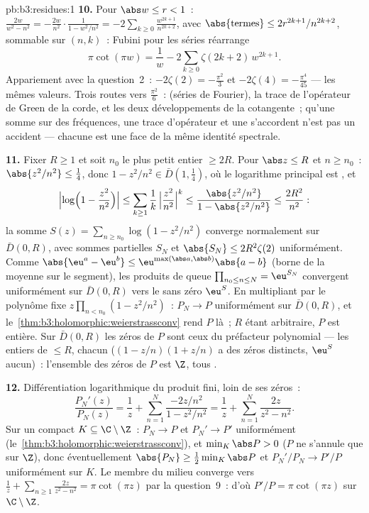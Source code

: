 \begin{solution}{pb:b3:residues:1}
\textbf{10.} Pour $\abs w \leq r < 1$~: $\frac{2w}{w^2 -
n^2} = -\frac{2w}{n^2}\cdot\frac1{1 - w^2/n^2} =
-2\sum_{k\geq0}\frac{w^{2k+1}}{n^{2k+2}}$, avec
$\abs{\text{termes}} \leq 2r^{2k+1}/n^{2k+2}$, sommable
sur $(n, k)$~: Fubini pour les séries réarrange
\[
\pi\cot(\pi w) = \frac1w -
2\sum_{k\geq0}\zeta(2k+2)\,w^{2k+1} .
\]
Appariement avec la question~2~: $-2\zeta(2) =
-\frac{\pi^2}3$ et $-2\zeta(4) = -\frac{\pi^4}{45}$ --- les
mêmes valeurs. Trois routes vers $\frac{\pi^2}6$~: 
(séries de Fourier), la trace de l'opérateur de Green de la
corde, et les deux développements de la cotangente~; qu'une
somme sur des fréquences, une trace d'opérateur et une
 s'accordent n'est pas un accident ---
chacune est une face de la même identité spectrale.

\textbf{11.} Fixer $R \geq 1$ et soit $n_0$ le plus petit
entier $\geq 2R$. Pour $\abs z \leq R$ et $n \geq n_0$~:
$\abs{z^2/n^2} \leq \frac14$, donc $1 - z^2/n^2 \in
\bar D(1, \frac14)$, où le logarithme principal est
, et
\[
\Bigl|\log\Bigl(1 - \frac{z^2}{n^2}\Bigr)\Bigr|
\leq \sum_{k\geq1}\frac1k\,\Bigl|\frac{z^2}{n^2}\Bigr|^k
\leq \frac{\abs{z^2/n^2}}{1 - \abs{z^2/n^2}}
\leq \frac{2R^2}{n^2} :
\]
la somme $S(z) = \sum_{n\geq n_0}\log(1 - z^2/n^2)$
converge normalement sur $\bar D(0, R)$, avec sommes
partielles  $S_N$ et $\abs{S_N} \leq
2R^2\zeta(2)$ uniformément. Comme $\abs{\eu^a - \eu^b}
\leq \eu^{\max(\abs a,\abs b)}\abs{a - b}$ (borne de la
moyenne sur le segment), les produits de queue
$\prod_{n_0\leq n\leq N} = \eu^{S_N}$ convergent
uniformément sur $\bar D(0, R)$ vers le sans zéro $\eu^S$.
En multipliant par le polynôme fixe $z\prod_{n<n_0}(1 -
z^2/n^2)$~: $P_N \to P$ uniformément sur $\bar D(0, R)$, et
le~\cref{thm:b3:holomorphic:weierstrassconv} rend $P$
 là~; $R$ étant arbitraire, $P$ est entière. Sur
$\bar D(0, R)$ les zéros de $P$ sont ceux du préfacteur
polynomial --- les entiers de  $\leq R$, chacun 
($(1 - z/n)(1 + z/n)$ a des zéros  distincts, $\eu^S$
aucun)~: l'ensemble des zéros de $P$ est $\Z$, tous .

\textbf{12.} Différentiation logarithmique du produit fini,
loin de ses zéros~:
\[
\frac{P_N'(z)}{P_N(z)} = \frac1z +
\sum_{n=1}^{N}\frac{-2z/n^2}{1 - z^2/n^2}
= \frac1z + \sum_{n=1}^{N}\frac{2z}{z^2 - n^2} .
\]
Sur un compact $K \subseteq \C\setminus\Z$~: $P_N \to P$ et
$P_N' \to P'$ uniformément
(le~\cref{thm:b3:holomorphic:weierstrassconv}), et $\min_K
\abs P > 0$ ($P$ ne s'annule que sur $\Z$), donc
éventuellement $\abs{P_N} \geq \frac12\min_K\abs P$ et
$P_N'/P_N \to P'/P$ uniformément sur $K$. Le membre du
milieu converge vers $\frac1z +
\sum_{n\geq1}\frac{2z}{z^2-n^2} = \pi\cot(\pi z)$ par la
question~9~: d'où $P'/P = \pi\cot(\pi z)$ sur
$\C\setminus\Z$.


\end{solution}
